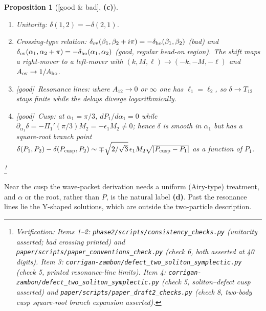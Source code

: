 \documentclass[11pt,a4paper]{article}
\newcommand{\lab}[1]{{\normalfont\sffamily\footnotesize\bfseries(#1)}}
\newcommand{\Lc}{\lab{c}}
\newcommand{\Ld}{\lab{d}}
\newcommand{\eqtag}[2]{{\normalfont\sffamily\footnotesize\textcolor{#1}{[#2]}}}
\newcommand{\Good}{\eqtag{teal!70!black}{good}}
\newcommand{\Both}{\eqtag{violet!70!black}{good \& bad}}
\newcommand{\scr}[1]{\nolinkurl{#1}}
\newcommand{\chk}[1]{\footnote{\raggedright Verification: #1.}}
\newtheorem{proposition}{Proposition}[section]
\theoremstyle{remark}
\begin{document}
\begin{proposition}[\Both, \Lc]\label{prop:props}
\begin{enumerate}
\item \emph{Unitarity:} $\delta(1,2)=-\delta(2,1)$.
\item \emph{Crossing-type relation:} $\delta_{\rm ov}(\beta_1,\beta_2+i\pi)=-\delta_{\rm ho}(\beta_1,\beta_2)$ (bad) and $\delta_{\rm ov}(\alpha_1,\alpha_2+\pi)=-\delta_{\rm ho}(\alpha_1,\alpha_2)$ (good, regular head-on region). The shift maps a right-mover to a left-mover with $(k,M,\ell)\to(-k,-M,-\ell)$ and $A_{\rm ov}\to1/A_{\rm ho}$.
\item \Good\ \emph{Resonance lines:} where $A_{12}\to0$ or $\infty$ one has $\ell_1=\ell_2$, so $\delta\to T_{12}$ stays finite while the delays diverge logarithmically.
\item \Good\ \emph{Cusp:} at $\alpha_1=\pi/3$, $dP_1/d\alpha_1=0$ while $\partial_{\alpha_1}\delta=-\Pi_1'(\pi/3)M_2=-\epsilon_1M_2\neq0$; hence $\delta$ is smooth in $\alpha_1$ but has a square-root branch point $\delta(P_1,P_2)-\delta(P_{\rm cusp},P_2)\sim\mp\sqrt{2/\sqrt3}\,\epsilon_1M_2\sqrt{|P_{\rm cusp}-P_1|}$ as a function of $P_1$.
\end{enumerate}
\chk{Items 1--2: \scr{phase2/scripts/consistency_checks.py} (unitarity asserted; bad crossing printed) and \scr{paper/scripts/paper_conventions_check.py} (check 6, both asserted at 40 digits). Item 3: \scr{corrigan-zambon/defect_two_soliton_symplectic.py} (check 5, printed resonance-line limits). Item 4: \scr{corrigan-zambon/defect_two_soliton_symplectic.py} (check 5, soliton--defect cusp asserted) and \scr{paper/scripts/paper_draft2_checks.py} (check 8, two-body cusp square-root branch expansion asserted)}
\end{proposition}
Near the cusp the wave-packet derivation needs a uniform (Airy-type) treatment, and $\alpha$ or the root, rather than $P$, is the natural label \Ld. Past the resonance lines lie the Y-shaped solutions, which are outside the two-particle description.
\end{document}
